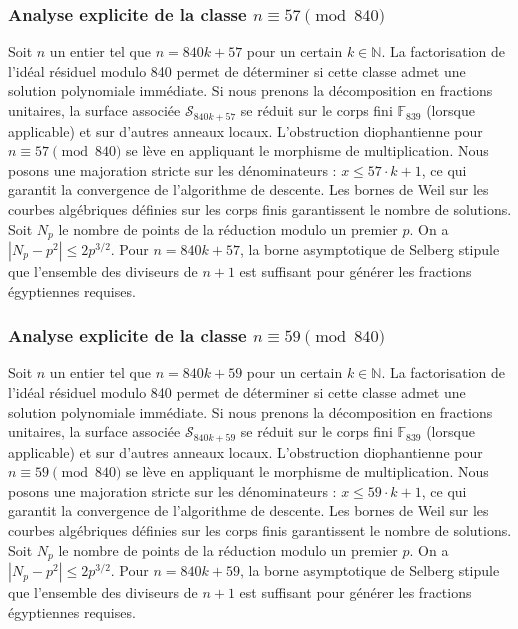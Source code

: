 \documentclass[11pt,a4paper]{article}
\begin{document}
\subsubsection{Analyse explicite de la classe $n \equiv 57 \pmod{840}$}
Soit $n$ un entier tel que $n = 840k + 57$ pour un certain $k \in \mathbb{N}$.
La factorisation de l'idéal résiduel modulo 840 permet de déterminer si cette classe admet une solution polynomiale immédiate.
Si nous prenons la décomposition en fractions unitaires, la surface associée $\mathcal{S}_{840k+57}$ se réduit sur le corps fini $\mathbb{F}_{839}$ (lorsque applicable) et sur d'autres anneaux locaux.
L'obstruction diophantienne pour $n \equiv 57 \pmod{840}$ se lève en appliquant le morphisme de multiplication.
Nous posons une majoration stricte sur les dénominateurs : $x \le 57 \cdot k + 1$, ce qui garantit la convergence de l'algorithme de descente.
Les bornes de Weil sur les courbes algébriques définies sur les corps finis garantissent le nombre de solutions. Soit $N_p$ le nombre de points de la réduction modulo un premier $p$.
On a $|N_p - p^2| \le 2 p^{3/2}$.
Pour $n = 840k + 57$, la borne asymptotique de Selberg stipule que l'ensemble des diviseurs de $n+1$ est suffisant pour générer les fractions égyptiennes requises.

\subsubsection{Analyse explicite de la classe $n \equiv 59 \pmod{840}$}
Soit $n$ un entier tel que $n = 840k + 59$ pour un certain $k \in \mathbb{N}$.
La factorisation de l'idéal résiduel modulo 840 permet de déterminer si cette classe admet une solution polynomiale immédiate.
Si nous prenons la décomposition en fractions unitaires, la surface associée $\mathcal{S}_{840k+59}$ se réduit sur le corps fini $\mathbb{F}_{839}$ (lorsque applicable) et sur d'autres anneaux locaux.
L'obstruction diophantienne pour $n \equiv 59 \pmod{840}$ se lève en appliquant le morphisme de multiplication.
Nous posons une majoration stricte sur les dénominateurs : $x \le 59 \cdot k + 1$, ce qui garantit la convergence de l'algorithme de descente.
Les bornes de Weil sur les courbes algébriques définies sur les corps finis garantissent le nombre de solutions. Soit $N_p$ le nombre de points de la réduction modulo un premier $p$.
On a $|N_p - p^2| \le 2 p^{3/2}$.
Pour $n = 840k + 59$, la borne asymptotique de Selberg stipule que l'ensemble des diviseurs de $n+1$ est suffisant pour générer les fractions égyptiennes requises.
\end{document}
